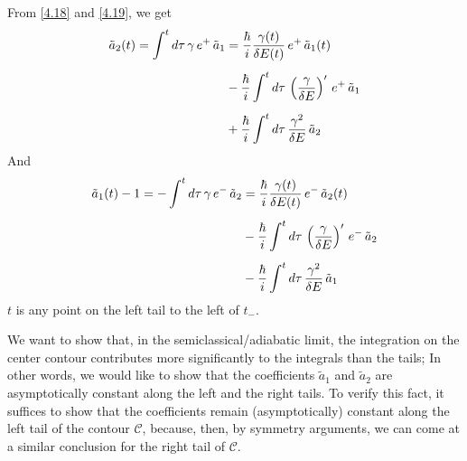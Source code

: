 \documentclass[12pt,a4paper]{article}
\begin{document}
	From \eqref{4.18} and \eqref{4.19}, we get
	\begin{align}
		\tilde{a}_{2}(t) = \int^{t} d\tau \, \gamma\, e^{+}\, \tilde{a}_{1} &= \dfrac{\hbar}{i} \dfrac{\gamma(t)}{\delta E(t)}\, e^{+}\, \tilde{a}_{1}(t) \notag \\[5pt]
		&- \dfrac{\hbar}{i} \int^{t} d\tau \, \left( \dfrac{\gamma}{\delta E} \right)'\, e^{+}\, \tilde{a}_{1} \notag \\[5pt]
		&+ \dfrac{\hbar}{i} \int^{t} d\tau \, \dfrac{\gamma^{2}}{\delta E} \,  \tilde{a}_{2} \label{4.21}
	\end{align}
	And
	\begin{align}
		\tilde{a}_{1}(t) - 1 = -\int^{t} d\tau \, \gamma\, e^{-}\, \tilde{a}_{2} &= \dfrac{\hbar}{i} \dfrac{\gamma(t)}{\delta E(t)}\, e^{-}\, \tilde{a}_{2}(t) \notag \\[5pt]
		&- \dfrac{\hbar}{i} \int^{t} d\tau \, \left( \dfrac{\gamma}{\delta E} \right)'\, e^{-}\, \tilde{a}_{2} \notag \\[5pt]
		&- \dfrac{\hbar}{i} \int^{t} d\tau \, \dfrac{\gamma^{2}}{\delta E} \,  \tilde{a}_{1} \label{4.22}
	\end{align}
	$t$ is any point on the left tail to the left of $t_{-}$.
	
	We want to show that, in the semiclassical/adiabatic limit, the integration on the center contour contributes more significantly to the integrals than the tails; In other words, we would like to show that the coefficients $\tilde{a}_{1}$ and $\tilde{a}_{2}$ are asymptotically constant along the left and the right tails. To verify this fact, it suffices to show that the coefficients remain (asymptotically) constant along the left tail of the contour $\mathcal{C}$, because, then, by symmetry arguments, we can come at a similar conclusion for the right tail of $\mathcal{C}$.
	
\end{document}
